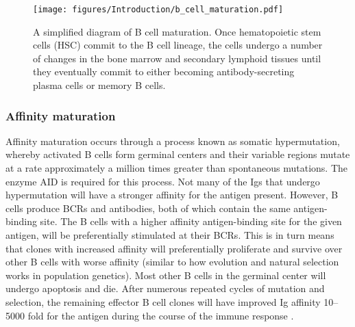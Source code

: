 \begin{figure}[htb]
\centering\texttt{[image: figures/Introduction/b\_cell\_maturation.pdf]}
\caption[B cell maturation]{A simplified diagram of B cell maturation.
Once hematopoietic stem cells (HSC) commit to the B cell lineage, the cells undergo a number of changes in the bone marrow and secondary lymphoid tissues until they eventually commit to either becoming antibody-secreting plasma cells or memory B cells.
}
\label{fig:b_cell_mat}\end{figure}

\subsubsection{Affinity maturation}
Affinity maturation occurs through a process known as somatic hypermutation, whereby activated B cells form germinal centers and their variable regions mutate at a rate approximately a million times greater than spontaneous mutations.
The enzyme AID is required for this process.
Not many of the Igs that undergo hypermutation will have a stronger affinity for the antigen present.
However, B cells produce BCRs and antibodies, both of which contain the same antigen-binding site.
The B cells with a higher affinity antigen-binding site for the given antigen, will be preferentially stimulated at their BCRs.
This is in turn means that clones with increased affinity will preferentially proliferate and survive over other B cells with worse affinity (similar to how evolution and natural selection works in population genetics).
Most other B cells in the germinal center will undergo apoptosis and die.
After numerous repeated cycles of mutation and selection, the remaining effector B cell clones will have improved Ig affinity 10--5000 fold for the antigen during the course of the immune response \cite{mishra2018insights}.

